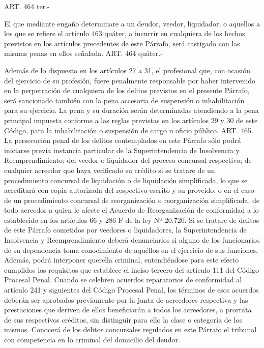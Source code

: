     ART. 464 ter.-

    El que mediante engaño determinare a un deudor, veedor, liquidador, o aquellos a los que se refiere el artículo 463 quáter, a incurrir en cualquiera de los hechos previstos en los artículos precedentes de este Párrafo, será castigado con las mismas penas en ellos señalada.
    ART. 464 quáter.-

    Además de lo dispuesto en los artículos 27 a 31, el profesional que, con ocasión del ejercicio de su profesión, fuere penalmente responsable por haber intervenido en la perpetración de cualquiera de los delitos previstos en el presente Párrafo, será sancionado también con la pena accesoria de suspensión o inhabilitación para su ejercicio.
    La pena y su duración serán determinadas atendiendo a la pena principal impuesta conforme a las reglas previstas en los artículos 29 y 30 de este Código, para la inhabilitación o suspensión de cargo u oficio público.
    ART. 465.
    La persecución penal de los delitos contemplados en este Párrafo sólo podrá iniciarse previa instancia particular de la Superintendencia de Insolvencia y Reemprendimiento; del veedor o liquidador del proceso concursal respectivo; de cualquier acreedor que haya verificado su crédito si se tratare de un procedimiento concursal de liquidación o de liquidación simplificada, lo que se acreditará con copia autorizada del respectivo escrito y su proveído; o en el caso de un procedimiento concursal de reorganización o reorganización simplificada, de todo acreedor a quien le afecte el Acuerdo de Reorganización de conformidad a lo establecido en los artículos 66 y 286 F de la ley Nº 20.720.
    Si se tratare de delitos de este Párrafo cometidos por veedores o liquidadores, la Superintendencia de Insolvencia y Reemprendimiento deberá denunciarlos si alguno de los funcionarios de su dependencia toma conocimiento de aquéllos en el ejercicio de sus funciones. Además, podrá interponer querella criminal, entendiéndose para este efecto cumplidos los requisitos que establece el inciso tercero del artículo 111 del Código Procesal Penal.
    Cuando se celebren acuerdos reparatorios de conformidad al artículo 241 y siguientes del Código Procesal Penal, los términos de esos acuerdos deberán ser aprobados previamente por la junta de acreedores respectiva y las prestaciones que deriven de ellos beneficiarán a todos los acreedores, a prorrata de sus respectivos créditos, sin distinguir para ello la clase o categoría de los mismos.
    Conocerá de los delitos concursales regulados en este Párrafo el tribunal con competencia en lo criminal del domicilio del deudor.
   

